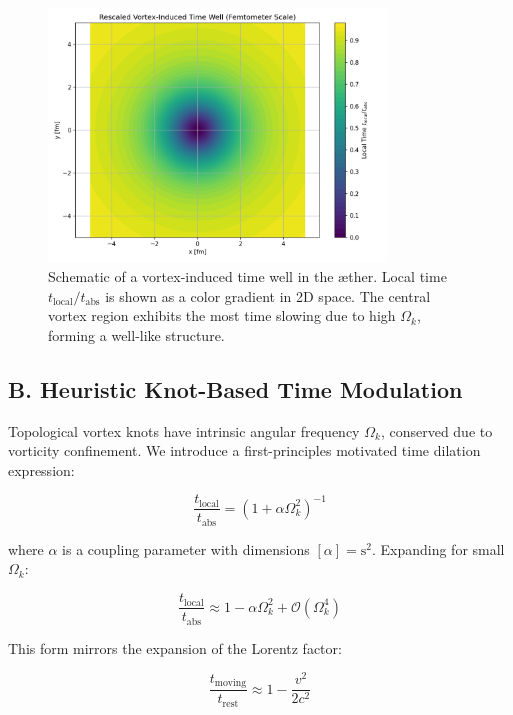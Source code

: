\begin{figure}[h!]
    \centering
    \includegraphics[width=0.8\textwidth]{export/RadialProfileOfLocalTimeDilation_Vortex-Induced_Time_Well}
    \caption{Schematic of a vortex-induced time well in the æther. Local time $t_{\text{local}} / t_{\text{abs}}$ is shown as a color gradient in 2D space. The central vortex region exhibits the most time slowing due to high $\Omega_k$, forming a well-like structure.}
    \label{fig:vortex_time_well}
\end{figure}


\subsection*{B. Heuristic Knot-Based Time Modulation}

Topological vortex knots have intrinsic angular frequency $\Omega_k$, conserved due to vorticity confinement. We introduce a first-principles motivated
time dilation expression:

\begin{equation}
\frac{t_{\text{local}}}{t_{\text{abs}}} = \left(1 + \alpha \Omega_k^2 \right)^{-1}
\end{equation}

where $\alpha$ is a coupling parameter with dimensions $[\alpha] = \text{s}^2$. Expanding for small $\Omega_k$:

\begin{equation}
\frac{t_{\text{local}}}{t_{\text{abs}}} \approx 1 - \alpha \Omega_k^2 + \mathcal{O}(\Omega_k^4)
\end{equation}

This form mirrors the expansion of the Lorentz factor:

\begin{equation}
\frac{t_{\text{moving}}}{t_{\text{rest}}} \approx 1 - \frac{v^2}{2 c^2}
\end{equation}

